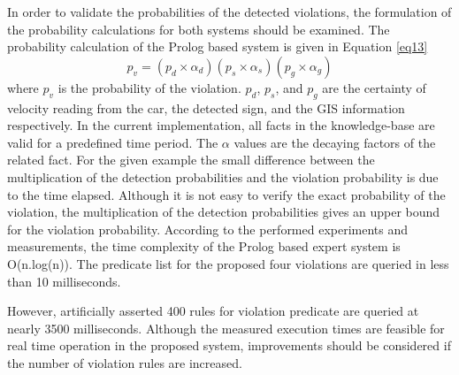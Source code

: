 \documentclass[a4paper,oneside,12pt]{report}
\begin{document}
In order to validate the probabilities of the detected violations, the formulation of the probability calculations for both systems should be examined. The probability calculation of the Prolog based system is given in Equation \ref{eq13}
\begin{equation}
\label{eq13}
	p_{v} = (p_{d} \times \alpha_{d} )(p_{s} \times \alpha_{s} )(p_{g} \times \alpha_{g})
\end{equation}
\noindent where $p_{v}$ is the probability of the violation. $p_{d}$, $p_{s}$, and $p_{g}$ are the certainty of velocity reading from the car, the detected sign, and the GIS information respectively. In the current implementation, all facts in the knowledge-base are valid for a predefined time period. The $\alpha$ values are the decaying factors of the related fact. For the given example the small difference between the multiplication of the detection probabilities and the violation probability is due to the time elapsed. Although it is not easy to verify the exact probability of the violation, the multiplication of the detection probabilities gives an upper bound for the violation probability. According to the performed experiments and measurements, the time complexity of the Prolog based expert system is O(n.log(n)). The predicate list for the proposed four violations are queried in less than 10 milliseconds. 

However, artificially asserted 400 rules for violation predicate are queried at nearly 3500 milliseconds. Although the measured execution times are feasible for real time operation in the proposed system, improvements should be considered if the number of violation rules are increased.
\end{document}
